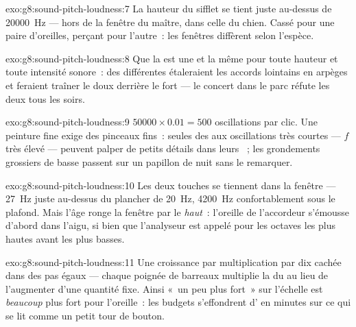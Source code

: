 \begin{solution}{exo:g8:sound-pitch-loudness:7}
La hauteur du sifflet se tient juste au-dessus de \qty{20000}{Hz} ---
hors de la fenêtre du maître, dans celle du chien. Cassé pour une
paire d'oreilles, perçant pour l'autre~: les fenêtres diffèrent selon
l'espèce.
\end{solution}

\begin{solution}{exo:g8:sound-pitch-loudness:8}
Que la  est une et la même pour toute hauteur et toute
intensité sonore~: des  différentes étaleraient les accords
lointains en arpèges et feraient traîner le doux derrière le fort ---
le concert dans le parc réfute les deux tous les soirs.
\end{solution}

\begin{solution}{exo:g8:sound-pitch-loudness:9}
$50000 \times 0.01 = 500$ oscillations par clic. Une peinture fine
exige des pinceaux fins~: seules des  aux oscillations très
courtes --- $f$ très élevé --- peuvent palper de petits détails dans
leurs ~; les grondements grossiers de basse  passent sur
un papillon de nuit sans le remarquer.
\end{solution}

\begin{solution}{exo:g8:sound-pitch-loudness:10}
Les deux touches se tiennent dans la fenêtre --- \qty{27}{Hz} juste
au-dessus du plancher de \qty{20}{Hz}, \qty{4200}{Hz} confortablement
sous le plafond. Mais l'âge ronge la fenêtre par le \emph{haut}~:
l'oreille de l'accordeur s'émousse d'abord dans l'aigu, si bien que
l'analyseur est appelé pour les octaves les plus hautes avant les plus
basses.
\end{solution}

\begin{solution}{exo:g8:sound-pitch-loudness:11}
Une croissance par multiplication par dix cachée dans des pas égaux
--- chaque poignée de barreaux multiplie la  du  au lieu de
l'augmenter d'une quantité fixe. Ainsi «~un peu plus fort~» sur
l'échelle est \emph{beaucoup} plus fort pour l'oreille~: les budgets
s'effondrent d' en minutes sur ce qui se lit comme un petit
tour de bouton.
\end{solution}

